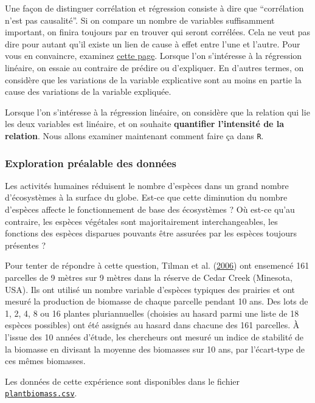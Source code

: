 \documentclass[
  a4paper,
]{article}
\begin{document}
Une façon de distinguer corrélation et régression consiste à dire que ``corrélation n'est pas causalité''. Si on compare un nombre de variables suffisamment important, on finira toujours par en trouver qui seront corrélées. Cela ne veut pas dire pour autant qu'il existe un lien de cause à effet entre l'une et l'autre. Pour vous en convaincre, examinez \href{http://www.tylervigen.com/spurious-correlations}{cette page}. Lorsque l'on s'intéresse à la régression linéaire, on essaie au contraire de prédire ou d'expliquer. En d'autres termes, on considère que les variations de la variable explicative sont au moins en partie la cause des variations de la variable expliquée.

Lorsque l'on s'intéresse à la régression linéaire, on considère que la relation qui lie les deux variables est linéaire, et on souhaite \textbf{quantifier l'intensité de la relation}. Nous allons examiner maintenant comment faire ça dans \texttt{R}.

\hypertarget{exploration-pruxe9alable-des-donnuxe9es-3}{%
\subsubsection{Exploration préalable des données}\label{exploration-pruxe9alable-des-donnuxe9es-3}}

Les activités humaines réduisent le nombre d'espèces dans un grand nombre d'écosystèmes à la surface du globe. Est-ce que cette diminution du nombre d'espèces affecte le fonctionnement de base des écosystèmes ? Où est-ce qu'au contraire, les espèces végétales sont majoritairement interchangeables, les fonctions des espèces disparues pouvants être assurées par les espèces toujours présentes ?

Pour tenter de répondre à cette question, Tilman et al. (\protect\hyperlink{ref-tilman2006}{2006}) ont ensemencé 161 parcelles de 9 mètres sur 9 mètres dans la réserve de Cedar Creek (Minesota, USA). Ils ont utilisé un nombre variable d'espèces typiques des prairies et ont mesuré la production de biomasse de chaque parcelle pendant 10 ans. Des lots de 1, 2, 4, 8 ou 16 plantes pluriannuelles (choisies au hasard parmi une liste de 18 espèces possibles) ont été assignés au hasard dans chacune des 161 parcelles. À l'issue des 10 années d'étude, les chercheurs ont mesuré un indice de stabilité de la biomasse en divisant la moyenne des biomasses sur 10 ans, par l'écart-type de ces mêmes biomasses.

Les données de cette expérience sont disponibles dans le fichier \href{https://besibo.github.io/Biometrie3/data/plantbiomass.csv}{\texttt{plantbiomass.csv}}.
\end{document}
